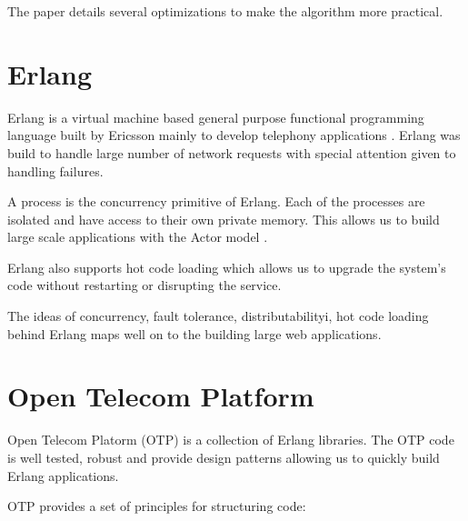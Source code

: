 The paper details several optimizations to make the algorithm more practical.

\section{Erlang}

Erlang \citep{erlang} is a virtual machine based general purpose functional 
programming language built by Ericsson mainly to develop telephony applications 
\citep{Armstrong07}. Erlang was build to handle large number of network
requests with special attention given to handling failures.

A process is the concurrency primitive of Erlang. Each of the processes are 
isolated and have access to their own private memory. This allows us to build
large scale applications with the Actor model%
\citep{Clinger81}.

Erlang also supports hot code loading which allows us to upgrade the system's
code without restarting or disrupting the service.

The ideas of concurrency, fault tolerance, distributabilityi, hot code loading
behind Erlang maps well on to the building large web applications.



\section{Open Telecom Platform}

Open Telecom Platorm (OTP) is a collection of Erlang libraries. The OTP code is
well tested, robust and provide design patterns allowing us to quickly build 
Erlang applications.

OTP provides a set of principles for structuring code:

